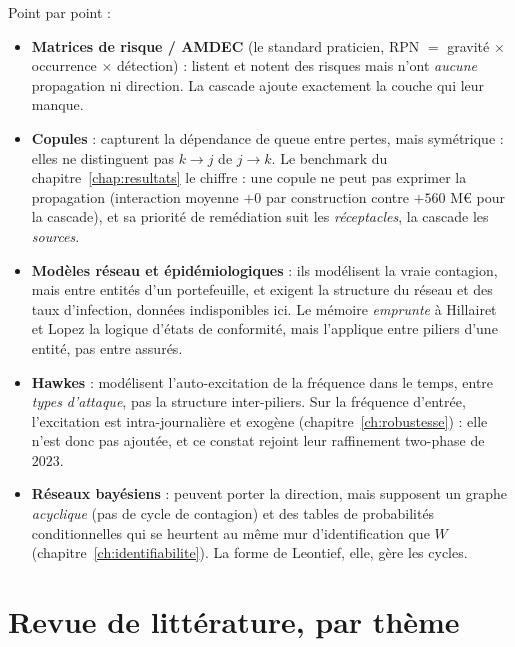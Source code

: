 \vspace{2pt}
Point par point :
\begin{itemize}\itemsep2pt
\item \textbf{Matrices de risque / AMDEC} (le standard praticien, RPN $=$ gravité $\times$
      occurrence $\times$ détection) : listent et notent des risques mais n'ont \emph{aucune}
      propagation ni direction. La cascade ajoute exactement la couche qui leur manque.
\item \textbf{Copules} \citep{BohmeKataria2006, HerathHerath2011} : capturent la
      dépendance de queue entre pertes, mais symétrique : elles ne distinguent pas
      $k\to j$ de $j\to k$. Le benchmark du chapitre~\ref{chap:resultats} le chiffre : une copule ne peut pas
      exprimer la propagation (interaction moyenne $+0$ par construction contre $+560$ M\euro{}
      pour la cascade), et sa priorité de remédiation suit les \emph{réceptacles}, la cascade
      les \emph{sources}.
\item \textbf{Modèles réseau et épidémiologiques} \citep{HillairetLopez2021,
      HillairetLopezDOultremontSpoorenberg2022, XuHua2017, Baldwin2017} : ils modélisent la
      vraie contagion, mais entre
      entités d'un portefeuille, et exigent la structure du réseau et des taux
      d'infection, données indisponibles ici. Le mémoire \emph{emprunte} à Hillairet et Lopez la
      logique d'états de conformité, mais l'applique entre piliers d'une entité,
      pas entre assurés.
\item \textbf{Hawkes} \citep{BessyRolandBoumezouedHillairet2021, BoumezouedCherkaouiHillairet2023} :
      modélisent l'auto-excitation de la fréquence dans le temps,
      entre \emph{types d'attaque}, pas la structure inter-piliers. Sur la fréquence d'entrée,
      l'excitation est intra-journalière et exogène (chapitre~\ref{ch:robustesse}) : elle n'est
      donc pas ajoutée, et ce constat rejoint leur raffinement two-phase de $2023$.
\item \textbf{Réseaux bayésiens} : peuvent porter la direction, mais supposent un graphe
      \emph{acyclique} (pas de cycle de contagion) et des tables de probabilités
      conditionnelles qui se heurtent au même mur d'identification que $W$
      (chapitre~\ref{ch:identifiabilite}). La forme de Leontief, elle, gère les cycles.
\end{itemize}

\section{Revue de littérature, par thème}

